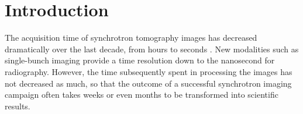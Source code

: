 \documentclass[twocolumn]{bmcart}%
\begin{document}
\begin{frontmatter}
\begin{abstractbox}
\begin{abstract}
\end{abstract}


\begin{keyword}
\end{keyword}


\end{abstractbox}
%

\end{frontmatter}



\section*{Introduction}

The acquisition time of synchrotron tomography images has decreased
dramatically over the last decade, from hours to
seconds \citep{Maire2014}. New modalities such as single-bunch
imaging \citep{Rack2014} provide a time resolution down to the nanosecond
for radiography. However, the time subsequently spent in processing the
images has not decreased as much, so that the outcome of a successful
synchrotron imaging campaign often takes weeks or even months to be
transformed into scientific results. 
\end{document}
